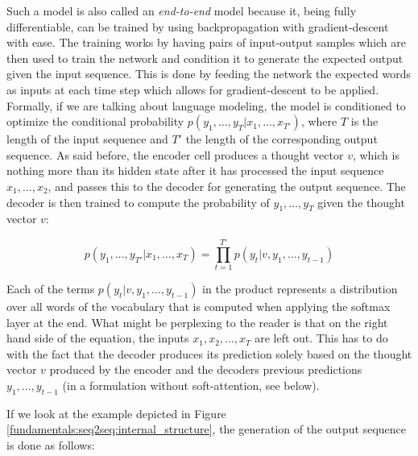 Such a model is also called an \emph{end-to-end} model because it, being fully differentiable, can be trained by using backpropagation with gradient-descent with ease. The training works by having pairs of input-output samples which are then used to train the network and condition it to generate the expected output given the input sequence. This is done by feeding the network the expected words as inputs at each time step which allows for gradient-descent to be applied. Formally, if we are talking about language modeling, the model is conditioned to optimize the conditional probability $p(y_1, \dots, y_{T}|x_1, \dots, x_{T'})$, where $T$ is the length of the input sequence and $T'$ the length of the corresponding output sequence. As said before, the encoder cell produces a thought vector $v$, which is nothing more than its hidden state after it has processed the input sequence $x_1, \dots, x_2$, and passes this to the decoder for generating the output sequence. The decoder is then trained to compute the probability of $y_1, \dots, y_T$ given the thought vector $v$:

\begin{equation}
p(y_1,\dots,y_{T'}|x_1,\dots,x_{T}) = \prod_{t=1}^{T'} p(y_t|v,y_1,\dots,y_{t-1})
\end{equation}

Each of the terms $p(y_t|v,y_1,\dots,y_{t-1})$ in the product represents a distribution over all words of the vocabulary that is computed when applying the softmax layer at the end. What might be perplexing to the reader is that on the right hand side of the equation, the inputs $x_1,x_2,\dots,x_T$ are left out. This has to do with the fact that the decoder produces its prediction solely based on the thought vector $v$ produced by the encoder and the decoders previous predictions $y_1,\dots,y_{t-1}$ (in a formulation without soft-attention, see below).

If we look at the example depicted in Figure \ref{fundamentals:seq2seq:internal_structure}, the generation of the output sequence is done as follows:


